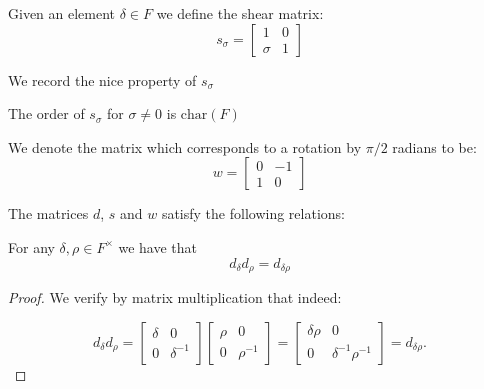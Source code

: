 \begin{definition}
\label{SpecialMatrices.s}
\leanok
    Given an element $\delta \in F$ we define the shear matrix:
    \[
    s_\sigma  = \begin{bmatrix}
    1 & 0\\
    \sigma & 1
    \end{bmatrix}
    \]
\end{definition}

We record the nice property of $s_\sigma$

\begin{lemma}
\label{SpecialMatrices.order_s_eq_char}
\leanok

The order of $s_\sigma$ for $\sigma \ne 0$ is $\textrm{char}(F)$
\end{lemma}



\begin{definition}
\label{SpecialMatrices.w}
\leanok
 We denote the matrix which corresponds to a rotation by $\pi / 2$ radians to be:
 \[
 w = \begin{bmatrix}
    0 & -1\\
    1 & 0
 \end{bmatrix}
 \]
\end{definition}

The matrices $d$, $s$ and $w$ satisfy the following relations:


\begin{lemma}
\label{SpecialMatrices.d_mul_d_eq_d_mul}
\leanok
For any $\delta, \rho \in F^\times$ we have that
\[
d_\delta d_\rho = d_{\delta\rho}
\]
\end{lemma}
\begin{proof}
    We verify by matrix multiplication that indeed:

    \begin{equation*}
        d_\delta d_\rho = \begin{bmatrix} \delta & 0 \\ 0 & \delta^{-1} \end{bmatrix} \begin{bmatrix} \rho & 0 \\ 0 & \rho^{-1} \end{bmatrix} = \begin{bmatrix} \delta \rho & 0 \\ 0 & \delta^{-1} \rho^{-1} \end{bmatrix} = d_{\delta \rho}.
    \end{equation*}
\end{proof}

